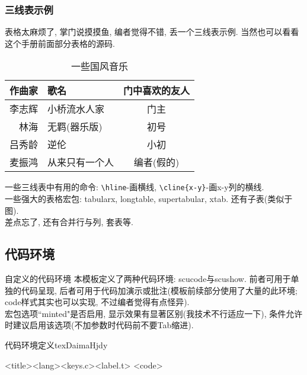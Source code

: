 \documentclass[hyperref,UTF8,11pt,CJK]{beamer}
\begin{document}
\cprotEnv\begin{frame}
	\frametitle{三线表示例}
	表格太麻烦了, 掌门说摸摸鱼, 编者觉得不错, 丢一个三线表示例. 当然也可以看看这个手册前面部分表格的源码.
	\begin{table}[htbp]
		\centering
		\caption{一些国风音乐}
		\label{tab:YixieGfyy}
		\begin{tabular}{rlc}
			\toprule
			作曲家 & 歌名 & 门中喜欢的友人 \\
			\midrule
			李志辉 & 小桥流水人家 & 门主 \\
			林海 & 无羁(器乐版) & 初号 \\
			吕秀龄 & 逆伦 & 小初 \\
			麦振鸿 & 从来只有一个人 & 编者(假的) \\
			\bottomrule
		\end{tabular}
	\end{table}
	一些三线表中有用的命令: \verb|\hline|-画横线, \verb|\cline|\verb!{x-y}!-画x-y列的横线.\\
	一些强大的表格宏包: tabularx, longtable, supertabular, xtab. 还有子表(类似于图).\\
	差点忘了, 还有合并行与列, 套表等.
\end{frame}

\subsection{代码环境}
\begin{frame}[fragile]{自定义的代码环境}
	本模板定义了两种代码环境: {\color{JXred}scucode}与{\color{JXred}scushow}. 前者可用于单独的代码呈现, 后者可用于代码加演示或批注(模板前续部分使用了大量的此环境; code样式其实也可以实现, 不过编者觉得有点怪异).\\
	宏包选项``minted"是否启用, 显示效果有显著区别(我技术不行适应一下), 条件允许时建议启用该选项({\color{JXred}不加参数时代码前不要Tab缩进}).
	\begin{scushow}[comment={%
			\scriptsize%
			{\color{JXred}<env>}\quad scucode或scushow\\
			{\color{JXred}<keys.t>}\quad 添加到tcolorbox中的参数, 如comment, sidebyside等\\
			{\color{JXred}<title>}\quad 标题\\
			{\color{JXred}<lang>}\quad 代码语言\\
			{\color{JXred}<keys.c>}\quad 添加到minted或listings中的参数\\
			{\color{JXred}<label.t>}\quad 引用标签尾部, 头部已定义(code:)\\
			{\color{JXred}<code>}\quad 代码\\
		},%
		listing above comment]{代码环境定义}{tex}{}{DaimaHjdy}
			\begin{<env>}[<keys.t>]{<title>}{<lang>}{<keys.c>}{<label.t>}
				<code>
			\end{<env>}
	\end{scushow}
\end{frame}
\end{document}
